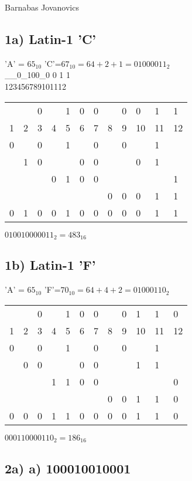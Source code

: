 \documentclass[]{article}
\date{}
\begin{document}
Barnabas Jovanovics

\subsection{1a) Latin-1 'C'}\label{a-14}

'A' = $65_{10}$ 'C'=$67_{10} = 64 + 2 + 1 = 01000011_{2}$\\

\_\_0\_100\_0 0 1 1\\
123456789101112

\begin{longtable}[l]{@{}llllllllllll@{}}
	\toprule
	 & &0& &1&0&0& &0& 0& 1& 1\\
	1&2&3&4&5&6&7&8&9&10&11&12\\
	\midrule
	0& &0& &1& &0& &0&  & 1&  \\
	 &1&0& & &0&0& & & 0& 1&  \\
	 & & &0&1&0&0& & &  &  & 1\\
	 & & & & & & &0&0& 0& 1& 1\\
	\hline
	0&1&0&0&1&0&0&0&0& 0& 1& 1\\
	\endhead
	\bottomrule
\end{longtable}

$010010000011_{2} = 483_{16}$

\subsection{1b) Latin-1 'F'}\label{a-14}

'A' = $65_{10}$ 'F'=$70_{10} = 64 + 4 + 2 = 01000110_{2}$\\

\begin{longtable}[l]{@{}llllllllllll@{}}
	\toprule
	 & &0& &1&0&0& &0& 1& 1& 0\\
	1&2&3&4&5&6&7&8&9&10&11&12\\
	\midrule
	0& &0& &1& &0& &0&  & 1&  \\
	 &0&0& & &0&0& & & 1& 1&  \\
	 & & &1&1&0&0& & &  &  & 0\\
	 & & & & & & &0&0& 1& 1& 0\\
	\hline
	0&0&0&1&1&0&0&0&0& 1& 1&0\\
	\endhead
	\bottomrule
\end{longtable}

$000110000110_{2} = 186_{16}$

\pagebreak

\subsection{2a) a) 100010010001 }\label{b-1332}
\end{document}

